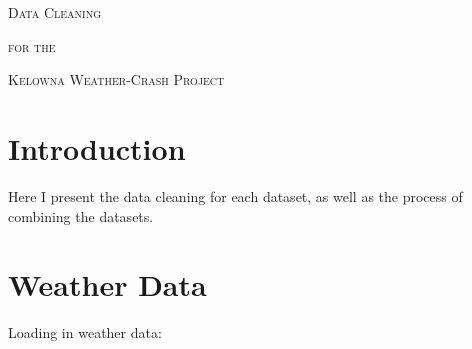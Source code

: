 \documentclass[11pt, a4paper]{article}
\begin{document}


\begin{center}
\Large{\textsc{Data Cleaning}}
\par
\normalsize{\textsc{for the}}
\par
\large{\textsc{Kelowna Weather-Crash Project}}
\end{center}


\vspace{0.917 pc} %

\tableofcontents


\pagebreak
\section{Introduction}



Here I present the data cleaning for each dataset, as well as the process of combining the datasets. 




\pagebreak
\section{Weather Data}
Loading in weather data:
\end{document}
